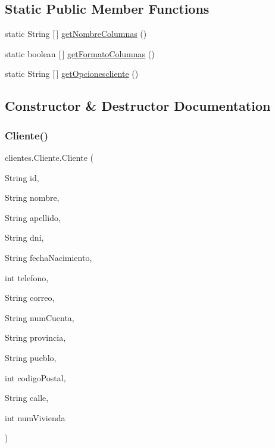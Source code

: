 \subsection*{Static Public Member Functions}
\begin{DoxyCompactItemize}
\item 
static String \mbox{[}$\,$\mbox{]} \mbox{\hyperlink{classclientes_1_1_cliente_aaedfb1a4a28af84fb0e22c75d0d9dfdd}{get\+Nombre\+Columnas}} ()
\item 
static boolean \mbox{[}$\,$\mbox{]} \mbox{\hyperlink{classclientes_1_1_cliente_a3e27faa4e105a87dad7a4dd3f01f2c4c}{get\+Formato\+Columnas}} ()
\item 
static String \mbox{[}$\,$\mbox{]} \mbox{\hyperlink{classclientes_1_1_cliente_ac66c36eb54668f7dead734827d61f75e}{get\+Opcionescliente}} ()
\end{DoxyCompactItemize}


\subsection{Constructor \& Destructor Documentation}
\mbox{\label{classclientes_1_1_cliente_a15501ae37e3b4370b2a73e9fb0581a23}} 
\subsubsection{\texorpdfstring{Cliente()}{Cliente()}}
{\footnotesize\ttfamily clientes.\+Cliente.\+Cliente (\begin{DoxyParamCaption}\item[{String}]{id,  }\item[{String}]{nombre,  }\item[{String}]{apellido,  }\item[{String}]{dni,  }\item[{String}]{fecha\+Nacimiento,  }\item[{int}]{telefono,  }\item[{String}]{correo,  }\item[{String}]{num\+Cuenta,  }\item[{String}]{provincia,  }\item[{String}]{pueblo,  }\item[{int}]{codigo\+Postal,  }\item[{String}]{calle,  }\item[{int}]{num\+Vivienda }\end{DoxyParamCaption})\hspace{0.3cm}{\ttfamily [inline]}}


